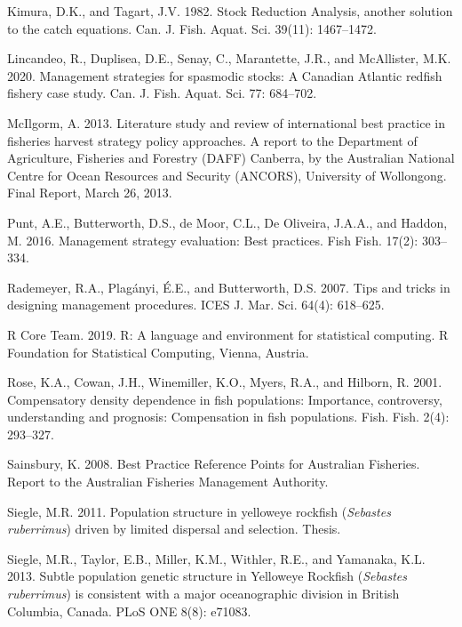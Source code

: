 \documentclass[11pt]{book}
\begin{document}
\leavevmode\hypertarget{ref-kimura1982}{}%
Kimura, D.K., and Tagart, J.V. 1982. Stock Reduction Analysis, another solution to the catch equations. Can. J. Fish. Aquat. Sci. 39(11): 1467--1472.

\leavevmode\hypertarget{ref-lincandeo2020}{}%
Lincandeo, R., Duplisea, D.E., Senay, C., Marantette, J.R., and McAllister, M.K. 2020. Management strategies for spasmodic stocks: A Canadian Atlantic redfish fishery case study. Can. J. Fish. Aquat. Sci. 77: 684--702.

\leavevmode\hypertarget{ref-mcilgorm2013}{}%
McIlgorm, A. 2013. Literature study and review of international best practice in fisheries harvest strategy policy approaches. A report to the Department of Agriculture, Fisheries and Forestry (DAFF) Canberra, by the Australian National Centre for Ocean Resources and Security (ANCORS), University of Wollongong. Final Report, March 26, 2013.

\leavevmode\hypertarget{ref-punt2016}{}%
Punt, A.E., Butterworth, D.S., de Moor, C.L., De Oliveira, J.A.A., and Haddon, M. 2016. Management strategy evaluation: Best practices. Fish Fish. 17(2): 303--334.

\leavevmode\hypertarget{ref-rademeyer2007}{}%
Rademeyer, R.A., Plagányi, É.E., and Butterworth, D.S. 2007. Tips and tricks in designing management procedures. ICES J. Mar. Sci. 64(4): 618--625.

\leavevmode\hypertarget{ref-r2019}{}%
R Core Team. 2019. R: A language and environment for statistical computing. R Foundation for Statistical Computing, Vienna, Austria.

\leavevmode\hypertarget{ref-rose2001}{}%
Rose, K.A., Cowan, J.H., Winemiller, K.O., Myers, R.A., and Hilborn, R. 2001. Compensatory density dependence in fish populations: Importance, controversy, understanding and prognosis: Compensation in fish populations. Fish. Fish. 2(4): 293--327.

\leavevmode\hypertarget{ref-sainsbury2008}{}%
Sainsbury, K. 2008. Best Practice Reference Points for Australian Fisheries. Report to the Australian Fisheries Management Authority.

\leavevmode\hypertarget{ref-siegle2011}{}%
Siegle, M.R. 2011. Population structure in yelloweye rockfish (\emph{Sebastes ruberrimus}) driven by limited dispersal and selection. Thesis.

\leavevmode\hypertarget{ref-siegle2013}{}%
Siegle, M.R., Taylor, E.B., Miller, K.M., Withler, R.E., and Yamanaka, K.L. 2013. Subtle population genetic structure in Yelloweye Rockfish (\emph{Sebastes ruberrimus}) is consistent with a major oceanographic division in British Columbia, Canada. PLoS ONE 8(8): e71083.
\end{document}
